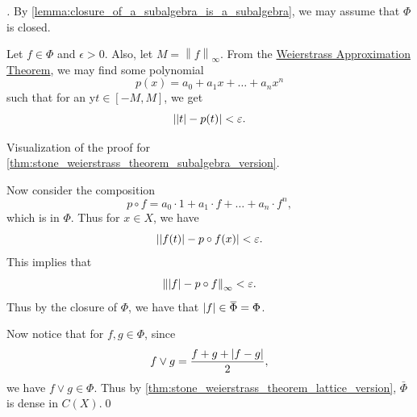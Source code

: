 \documentclass[notoc,notitlepage]{tufte-book}
\newcommand{\norm}[1]{\left\| #1 \right\|}
\begin{document}
\begin{proof}[\vvimponote]
  By \cref{lemma:closure_of_a_subalgebra_is_a_subalgebra}, we may assume that $\Phi$ is closed.

  Let $f \in \Phi$ and $\epsilon > 0$. Also, let $M = \norm{f}_\infty$. From the \hyperref[thm:weierstrass_approximation_theorem]{Weierstrass Approximation Theorem}, we may find some polynomial
  \begin{equation*}
    p(x) = a_0 + a_1 x + \hdots + a_n x^n
  \end{equation*}
  such that for an y$t \in [-M, M]$, we get
  \begin{equation*}
    \left| \left| t \right| - p(t) \right| < \varepsilon.
  \end{equation*}
  \begin{marginfigure}
    \centering
    \caption{Visualization of the proof for \cref{thm:stone_weierstrass_theorem_subalgebra_version}.}\label{fig:visualization_of_the_proof_for_stone_weierstrass_theorem_subalgebra_version}
  \end{marginfigure}
  Now consider the composition
  \begin{equation*}
    p \circ f = a_0 \cdot 1 + a_1 \cdot f + \hdots + a_n \cdot f^n,
  \end{equation*}
  which is in $\Phi$. Thus for $x \in X$, we have
  \begin{equation*}
    \left| \left| f(t) \right| - p \circ f(x) \right| < \varepsilon.
  \end{equation*}
  This implies that
  \begin{equation*}
    \norm{ \abs{ f } - p \circ f }_\infty < \epsilon.
  \end{equation*}
  Thus by the closure of $\Phi$, we have that $\abs{ f } \in \bar{\Phi} = \Phi$.

  Now notice that for $f, g \in \Phi$, since
  \begin{equation*}
    f \lor g = \frac{f + g + \left| f - g \right|}{2},
  \end{equation*}
  we have $f \lor g \in \Phi$. Thus by \cref{thm:stone_weierstrass_theorem_lattice_version}, $\bar{\Phi}$ is dense in $C(X)$.\qed\
\end{proof}
\end{document}
